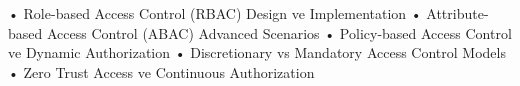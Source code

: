 • Role-based Access Control (RBAC) Design ve Implementation
• Attribute-based Access Control (ABAC) Advanced Scenarios
• Policy-based Access Control ve Dynamic Authorization
• Discretionary vs Mandatory Access Control Models
• Zero Trust Access ve Continuous Authorization